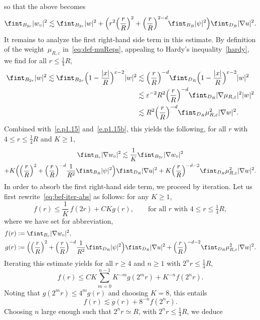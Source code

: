 \documentclass[JEP,XML,SOM,Unicode,published]{cedram}
\theoremstyle{plain}
\theoremstyle{definition}
\newcommand{\e}{\varepsilon}
\begin{document}
so that the above becomes
\begin{equation}\label{e.p1.15b}
\fint_{B_{2r}} |w_\circ|^2 \lesssim \fint_{B_{2r}} |w|^2 + \Big(r^2\Bigl(\frac{r}{R}\Bigr)^2+\Bigl(\frac{r}{R}\Bigr)^{2-d}\fint_{B_{R}} |\psi|^2\Big) \fint_{D_R}|\nabla u|^2.
\end{equation}
It remains to analyze the first right-hand side term in this estimate.
By definition of the weight~$\mu_{R,\e}$ in~\eqref{eq:def-muReps}, appealing to Hardy's inequality~\eqref{hardy},
we find for all $r\le \frac14R$,
\begin{align*}
\fint_{B_{2r}} |w|^2 \lesssim \fint_{B_{2r}} \Big(1-\frac{|x|}{R}\Big)^{\e-2} |w|^2
&\lesssim \Bigl(\frac{r}{R}\Bigr)^{-d} \fint_{D_{R}} \Big(1-\frac{|x|}{R}\Big)^{\e-2}|w|^2\\
&\lesssim \e^{-2} R^2\Bigl(\frac{r}{R}\Bigr)^{-d} \fint_{D_{R}} |\nabla \mu_{R,\e}|^2 |w|^2\\
&\lesssim R^2\Bigl(\frac{r}{R}\Bigr)^{-d}\fint_{D_R} \mu_{R,\e}^2 |\nabla w|^2.
\end{align*}
Combined with~\eqref{e.p1.15} and~\eqref{e.p1.15b}, this yields the following, for all $r$ with $4\le r\le \frac14R$ and $K\ge1$,
\begin{multline}\label{eq:bef-iter-abs}
\fint_{B_{r}}|\nabla w_\circ|^2\lesssim \frac1K\fint_{B_{2r}}|\nabla w_\circ|^2\\
+ K\Big(\Bigl(\frac{r}{R}\Bigr)^2+\Bigl(\frac{r}{R}\Bigr)^{-d}\frac1{R^2}\fint_{B_{R}} |\psi|^2\Big) \fint_{D_R}|\nabla u|^2+K\Bigl(\frac{r}{R}\Bigr)^{-d-2}\fint_{D_R} \mu_{R,\e}^2 |\nabla w|^2.
\end{multline}
In order to absorb the first right-hand side term, we proceed by iteration. Let us first rewrite~\eqref{eq:bef-iter-abs} as follows: for any $K\ge1$,
\[f(r)\le \frac1K\,f(2r)+CKg(r),\qquad\text{for all $r$ with $4\le r\le\tfrac14R$},\]
where we have set for abbreviation,
\begin{align*}
f(r)&:= \fint_{B_r} |\nabla w_\circ|^2,\\
g(r)&:= \Big( \Bigl(\frac{r}{R}\Bigr)^2+\Bigl(\frac{r}{R}\Bigr)^{-d}\frac1{R^2} \fint_{D_R} |\psi|^2 \Big)\fint_{D_R} |\nabla u|^2
+\Bigl(\frac{r}{R}\Bigr)^{-d-2}\fint_{D_R} \mu_{R,\e}^2 |\nabla w|^2.
\end{align*}
Iterating this estimate yields for all $r\ge4$ and $n\ge1$ with $2^nr\le\frac14R$,
\[f(r)\le CK\sum_{m=0}^{n-1} K^{-m}g(2^mr)+K^{-n}f(2^nr).\]
Noting that $g(2^mr)\le 4^mg(r)$ and choosing $K=8$, this entails
\[f(r)\lesssim g(r)+8^{-n}f(2^nr).\]
Choosing $n$ large enough such that $2^nr\simeq R$, with $2^nr\le\frac14R$, we deduce
\end{document}
